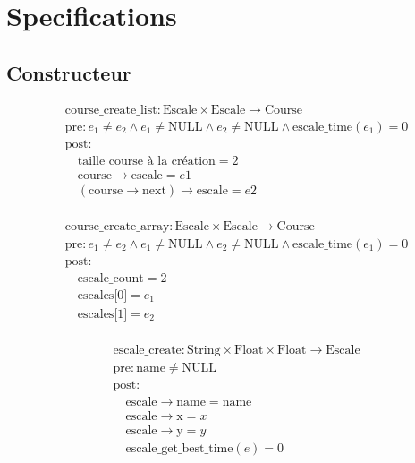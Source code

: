 \section{Specifications}\label{specifications}

\subsection{Constructeur}


\[
\begin{aligned}
&\text{course\_create\_list}: \text{Escale} \times \text{Escale} \to \text{Course} \\
&\text{pre}: e_1 \neq e_2 \land e_1 \neq \text{NULL} \land e_2 \neq \text{NULL} \land \text{escale\_time}(e_1) = 0 \\
&\text{post}: \\
&\quad \text{taille course à la création} = 2 \\
&\quad \text{course}\rightarrow\text{escale} = e1 \\
&\quad (\text{course}\rightarrow\text{next})\rightarrow\text{escale} = e2 \\
\end{aligned}
\]



\[
\begin{aligned}
&\text{course\_create\_array}: \text{Escale} \times \text{Escale} \to \text{Course} \\
&\text{pre}: e_1 \neq e_2 \land e_1 \neq \text{NULL} \land e_2 \neq \text{NULL} \land \text{escale\_time}(e_1) = 0 \\
&\text{post}: \\
&\quad \text{escale\_count} = 2 \\
&\quad \text{escales[0]} = e_1 \\
&\quad \text{escales[1]} = e_2 \\
\end{aligned}
\]


\[
\begin{aligned}
&\text{escale\_create}: \text{String} \times \text{Float} \times \text{Float} \to \text{Escale} \\
&\text{pre}: \text{name} \neq \text{NULL} \\
&\text{post}: \\
&\quad \text{escale}\rightarrow\text{name} = \text{name} \\
&\quad \text{escale}\rightarrow\text{x} = x \\
&\quad \text{escale}\rightarrow\text{y}= y \\
&\quad \text{escale\_get\_best\_time}(e) = 0
\end{aligned}
\]


